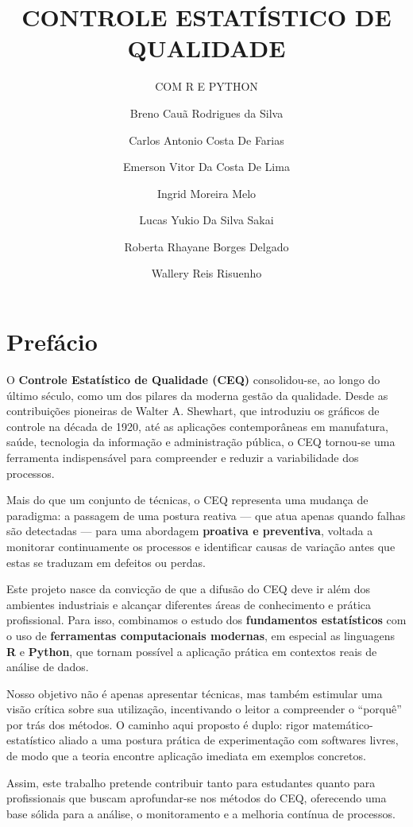 \documentclass[
  portuguese,
  11pt,
  a4paper,
  DIV=11,
  numbers=noendperiod]{scrreprt}
\title{CONTROLE ESTATÍSTICO DE QUALIDADE}
\subtitle{COM R E PYTHON}
\author{Breno Cauã Rodrigues da Silva \and Carlos Antonio Costa De
Farias \and Emerson Vitor Da Costa De Lima \and Ingrid Moreira
Melo \and Lucas Yukio Da Silva Sakai \and Roberta Rhayane Borges
Delgado \and Wallery Reis Risuenho}
\date{}
\renewcommand*\contentsname{Índice}
\newcommand\contentsname{Índice}
\begin{document}
\maketitle

\renewcommand*\contentsname{Índice}
{
\hypersetup{linkcolor=}
\setcounter{tocdepth}{2}
\tableofcontents
}


\chapter*{Prefácio}\label{prefuxe1cio}


O \textbf{Controle Estatístico de Qualidade (CEQ)} consolidou-se, ao
longo do último século, como um dos pilares da moderna gestão da
qualidade. Desde as contribuições pioneiras de Walter A. Shewhart, que
introduziu os gráficos de controle na década de 1920, até as aplicações
contemporâneas em manufatura, saúde, tecnologia da informação e
administração pública, o CEQ tornou-se uma ferramenta indispensável para
compreender e reduzir a variabilidade dos processos.

Mais do que um conjunto de técnicas, o CEQ representa uma mudança de
paradigma: a passagem de uma postura reativa --- que atua apenas quando
falhas são detectadas --- para uma abordagem \textbf{proativa e
preventiva}, voltada a monitorar continuamente os processos e
identificar causas de variação antes que estas se traduzam em defeitos
ou perdas.

Este projeto nasce da convicção de que a difusão do CEQ deve ir além dos
ambientes industriais e alcançar diferentes áreas de conhecimento e
prática profissional. Para isso, combinamos o estudo dos
\textbf{fundamentos estatísticos} com o uso de \textbf{ferramentas
computacionais modernas}, em especial as linguagens \textbf{R} e
\textbf{Python}, que tornam possível a aplicação prática em contextos
reais de análise de dados.

Nosso objetivo não é apenas apresentar técnicas, mas também estimular
uma visão crítica sobre sua utilização, incentivando o leitor a
compreender o ``porquê'' por trás dos métodos. O caminho aqui proposto é
duplo: rigor matemático-estatístico aliado a uma postura prática de
experimentação com softwares livres, de modo que a teoria encontre
aplicação imediata em exemplos concretos.

Assim, este trabalho pretende contribuir tanto para estudantes quanto
para profissionais que buscam aprofundar-se nos métodos do CEQ,
oferecendo uma base sólida para a análise, o monitoramento e a melhoria
contínua de processos.
\end{document}
